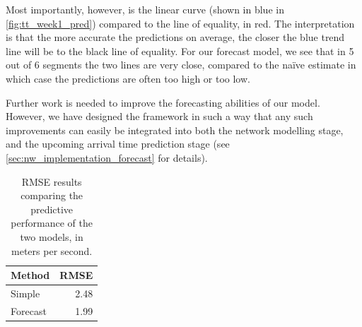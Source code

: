 Most importantly, however, is the linear curve (shown in blue in \cref{fig:tt_week1_pred}) compared to the line of equality, in red. The interpretation is that the more accurate the predictions on average, the closer the blue trend line will be to the black line of equality. For our forecast model, we see that in 5 out of 6 segments the two lines are very close, compared to the na\"ive estimate in which case the predictions are often too high or too low.


Further work is needed to improve the forecasting abilities of our model. However, we have designed the framework in such a way that any such improvements can easily be integrated into both the network modelling stage, and the upcoming arrival time prediction stage (see \cref{sec:nw_implementation_forecast} for details).

\begin{table}

\caption{\label{tab:tt_pred_rmse}RMSE results comparing the predictive performance of the two models, in meters per second.}
\centering
\begin{tabular}[t]{lr}
\toprule
Method & RMSE\\
\midrule
Simple & 2.48\\
Forecast & 1.99\\
\bottomrule
\end{tabular}
\end{table}


